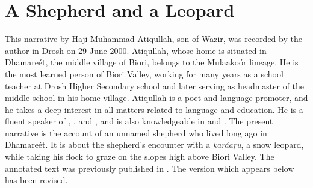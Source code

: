 \appendix
{}

\section*{A Shepherd and a Leopard}

This narrative by Haji Muhammad Atiqullah, son of Wazir, was recorded by the author in Drosh on 29 June 2000. Atiqullah, whose home is situated in Dhamareét, the middle village of Biori, belongs to the Mulaakoór lineage. He is the most learned person of Biori Valley, working for many years as a school teacher at Drosh Higher Secondary school and later serving as headmaster of the middle school in his home village. Atiqullah is a poet and language promoter, and he takes a deep interest in all matters related to language and education. He is a fluent speaker of \iliPashto, \iliKhowar, \iliUrdu and \iliEnglish, and is also knowledgeable in \iliArabic and \iliPersian. The present narrative is the account of an unnamed shepherd who lived long ago in Dhamareét. It is about the shepherd’s encounter with a \textit{karáaṛu}, a snow leopard, while taking his flock to graze on the slopes high above Biori Valley. The annotated text was previously published in \citet[182--187]{liljegrenhaider2015}. The version which appears below has been revised.

